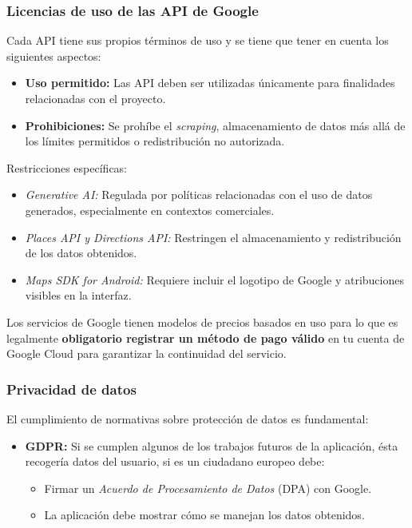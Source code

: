 \subsubsection{Licencias de uso de las API de Google}
Cada API tiene sus propios términos de uso \cite{google_cloud_terms} y se tiene que tener en cuenta los siguientes aspectos:
\begin{itemize}
	\item \textbf{Uso permitido:} Las API deben ser utilizadas únicamente para finalidades relacionadas con el proyecto.
	\item \textbf{Prohibiciones:} Se prohíbe el \textit{scraping}, almacenamiento de datos más allá de los límites permitidos o redistribución no autorizada.
\end{itemize}

Restricciones específicas:
\begin{itemize}
	\item \textit{Generative AI:} Regulada por políticas relacionadas con el uso de datos generados, especialmente en contextos comerciales.
	\item \textit{Places API y Directions API:} Restringen el almacenamiento y redistribución de los datos obtenidos.
	\item \textit{Maps SDK for Android:} Requiere incluir el logotipo de Google y atribuciones visibles en la interfaz.
\end{itemize}

Los servicios de Google tienen modelos de precios basados en uso para lo que es legalmente\textbf{ obligatorio registrar un método de pago válido} en tu cuenta de Google Cloud para garantizar la continuidad del servicio.

\subsubsection{Privacidad de datos}

El cumplimiento de normativas sobre protección de datos es fundamental:

\begin{itemize}
	\item \textbf{GDPR:} Si se cumplen algunos de los trabajos futuros de la aplicación, ésta recogería datos del usuario, si es un ciudadano europeo debe:
	\begin{itemize}
		\item Firmar un \textit{Acuerdo de Procesamiento de Datos} (DPA) con Google.
		\item La aplicación debe mostrar cómo se manejan los datos obtenidos.
	\end{itemize}
\end{itemize}

